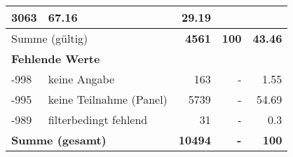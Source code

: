 \begin{longtable}{lXrrr}
       \num{3063} &
       \num[round-mode=places,round-precision=2]{67.16} &
         \num[round-mode=places,round-precision=2]{29.19} \\
     \midrule
     \multicolumn{2}{l}{Summe (gültig)} &
       \textbf{\num{4561}} &
     \textbf{\num{100}} &
       \textbf{\num[round-mode=places,round-precision=2]{43.46}} \\
     \multicolumn{5}{l}{\textbf{Fehlende Werte}}\\
       -998 &
       keine Angabe &
         \num{163} &
        - &
         \num[round-mode=places,round-precision=2]{1.55} \\
       -995 &
       keine Teilnahme (Panel) &
         \num{5739} &
        - &
         \num[round-mode=places,round-precision=2]{54.69} \\
       -989 &
       filterbedingt fehlend &
         \num{31} &
        - &
         \num[round-mode=places,round-precision=2]{0.3} \\
     \midrule
     \multicolumn{2}{l}{\textbf{Summe (gesamt)}} &
          \textbf{\num{10494}} &
        \textbf{-} &
        \textbf{\num{100}} \\
     \bottomrule
     \end{longtable}
     
